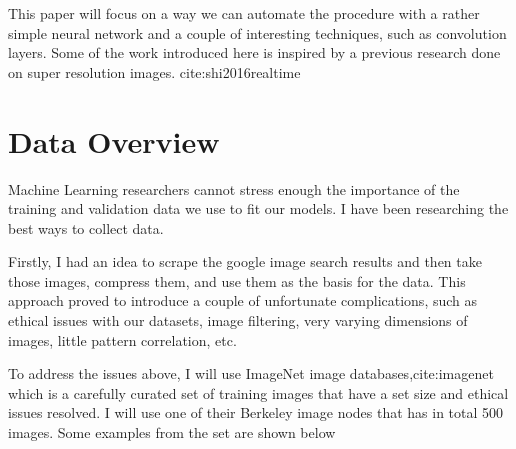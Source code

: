 \documentclass[12pt]{article}
\begin{document}
This paper will focus on a way we can automate the procedure with a rather simple
neural network and a couple of interesting techniques, such as convolution layers.
Some of the work introduced here is inspired by a previous research done on super
resolution images. cite:shi2016realtime

\section*{Data Overview}
\label{sec:org66110f4}
Machine Learning researchers cannot stress enough the importance of the training and
validation data we use to fit our models. I have been researching the best ways to
collect data.

Firstly, I had an idea to scrape the google image search results and then take those
images, compress them, and use them as the basis for the data. This approach proved
to introduce a couple of unfortunate complications, such as ethical issues with our
datasets, image filtering, very varying dimensions of images, little pattern
correlation, etc.

To address the issues above, I will use ImageNet image databases,cite:imagenet which
is a carefully curated set of training images that have a set size and ethical issues
resolved. I will use one of their Berkeley image nodes that has in total 500 images.
Some examples from the set are shown below
\end{document}
